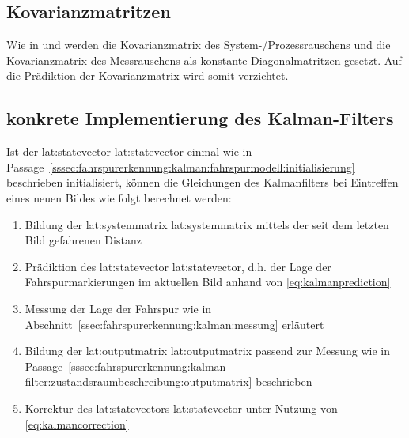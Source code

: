 \subsection{Kovarianzmatritzen}
Wie in \autocite{petersfalkoFPGAbasierteBildverarbeitungspipelineZur2009} und \autocite{risackRobustLaneRecognition} werden die Kovarianzmatrix des System-/Prozessrauschens  und die Kovarianzmatrix des Messrauschens  als konstante Diagonalmatritzen gesetzt. Auf die Prädiktion der Kovarianzmatrix  wird somit verzichtet.

\subsection{konkrete Implementierung des Kalman-Filters}
Ist der \glsdesc{lat:statevector} \gls{lat:statevector} einmal wie in Passage~\ref{sssec:fahrspurerkennung:kalman:fahrspurmodell:initialisierung} beschrieben initialisiert, können die Gleichungen des Kalmanfilters bei Eintreffen eines neuen Bildes wie folgt berechnet werden:
\begin{enumerate}
\item Bildung der \glsdesc{lat:systemmatrix} \gls{lat:systemmatrix} mittels der seit dem letzten Bild gefahrenen Distanz 
\item Prädiktion des \glsdesc{lat:statevector} \gls{lat:statevector}, d.h. der Lage der Fahrspurmarkierungen im aktuellen Bild anhand von \eqref{eq:kalmanprediction}
\item Messung der Lage der Fahrspur wie in Abschnitt~\ref{ssec:fahrspurerkennung:kalman:messung}
erläutert
\item Bildung der \glsdesc{lat:outputmatrix} \gls{lat:outputmatrix} passend zur Messung wie in Passage~\ref{sssec:fahrspurerkennung:kalman-filter:zustandsraumbeschreibung:outputmatrix} beschrieben
\item Korrektur des \glsdesc{lat:statevector}s \gls{lat:statevector} unter Nutzung von \eqref{eq:kalmancorrection}
\end{enumerate}




